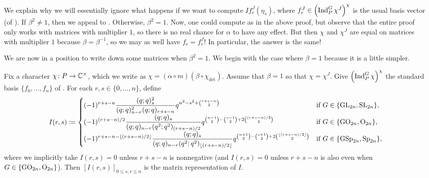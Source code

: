 \begin{remark} \label{rem:i-on-fj}
	We explain why we will essentially ignore what happens if we want to compute $If_r^J(\eta_s)$, where $f_r^J\in\left(\operatorname{Ind}_P^G\chi^J\right)^{\chi}$ is the usual basis vector (of ). If $\beta^2\ne1$, then we appeal to . Otherwise, $\beta^2=1$. Now, one could compute as in the above proof, but observe that the entire proof only works with matrices with multiplier $1$, so there is no real chance for $\alpha$ to have any effect. But then $\chi$ and $\chi^J$ are equal on matrices with multiplier $1$ because $\beta=\beta^{-1}$, so we may as well have $f_r=f_r^J$! In particular, the answer is the same!
\end{remark}
We are now in a position to write down some matrices when $\beta^2=1$. We begin with the case where $\beta=1$ because it is a little simpler.
\begin{proposition} \label{prop:trivial-matrix-coeffs}
	Fix a character $\chi\colon P\to\mathbb C^\times$, which we write as $\chi=(\alpha\circ m)(\beta\circ\chi_{\det})$. Assume that $\beta=1$ so that $\chi=\chi^J$. Give $\left(\operatorname{Ind}_P^G\chi\right)^\chi$ the standard basis $\{f_0,\ldots,f_n\}$ of . For each $r,s\in\{0,\ldots,n\}$, define
	\[I(r,s)\coloneqq\begin{cases}
		\displaystyle(-1)^{r+s-n}\frac{(q;q)_s^2}{(q;q)_{n-r}^2(q;q)_{r+s-n}}q^{n^2-s^2+\binom{r+s-n}2} & \text{if }G\in\{\mathrm{GL}_{2n},\mathrm{SL}_{2n}\}, \\
		\displaystyle(-1)^{(r+s-n)/2}\frac{(q;q)_s}{(q;q)_{n-r}(q^2;q^2)_{(r+s-n)/2}}q^{\binom{n-1}2-\binom{s-1}2+2\binom{(r+s-n)/2}2} & \text{if }G\in\{\mathrm{GO}_{2n},\mathrm{O}_{2n}\}, \\
		\displaystyle(-1)^{r+s-n-\left\lfloor{(r+s-n)/2}\right\rfloor}\frac{(q;q)_s}{(q;q)_{n-r}(q^2;q^2)_{\left\lfloor{(r+s-n)/2}\right\rfloor}}q^{\binom{n+1}2-\binom{s+1}2+2\binom{\left\lfloor{(r+s-n)/2}\right\rfloor}2} & \text{if }G\in\{\mathrm{GSp}_{2n},\mathrm{Sp}_{2n}\}, \\
	\end{cases}\]
	where we implicitly take $I(r,s)=0$ unless $r+s-n$ is nonnegative (and $I(r,s)=0$ unless $r+s-n$ is also even when $G\in\{\mathrm{GO}_{2n},\mathrm{O}_{2n}\}$). Then $[I(r,s)]_{0\le s,r\le n}$ is the matrix representation of $I$.
\end{proposition}

